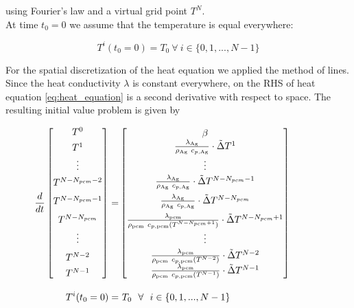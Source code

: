 \documentclass{scrartcl}[12pt, halfparskip]
\begin{document}
using Fourier's law and a virtual grid point $T^N$. \\
At time $t_0=0$ we assume that the temperature is equal everywhere:

\begin{equation}
	T^i(t_0=0) = T_0 \ \forall \ i \in \{ 0,1,...,N-1 \}
\end{equation}

For the spatial discretization of the heat equation we applied the method of lines. Since the heat conductivity $\lambda$ is constant everywhere, on the RHS of heat equation \eqref{eq:heat_equation} is a second derivative with respect to space. The resulting initial value problem is given by

\begin{align}
\hspace{-2cm}
\frac{d}{dt} \begin{bmatrix*}
T^0 \\[1ex]
T^1 \\[0.3ex]
\vdots \\[1ex]
T^{N-N_{pcm}-2} \\[1.7ex]
T^{N-N_{pcm}-1} \\[1.7ex]
T^{N-N_{pcm}} \\[0.5ex]
\vdots \\[1.5ex]
T^{N-2} \\[1ex]
T^{N-1}
\end{bmatrix*} = &
\begin{bmatrix}
\beta \\
\frac{\lambda_{\text{Ag}}}{\rho_{\text{Ag}} \ c_{p,\text{Ag}}} \cdot \tilde{\Delta} T^1 \\[0.7ex]
\vdots \\[0.3ex]
\frac{\lambda_{\text{Ag}}}{\rho_{\text{Ag}} \ c_{p,\text{Ag}}} \cdot \tilde{\Delta} T^{N-N_{pcm}-1} \\[1.5ex]
\frac{\lambda_{\text{Ag}}}{\rho_{\text{Ag}} \ c_{p,\text{Ag}}} \cdot \tilde{\Delta} T^{N-N_{pcm}} \\[1.5ex]
\frac{\lambda_{\text{pcm}}}{\rho_{\text{pcm}} \ c_{p,{\text{pcm}}}(T^{N-N_{pcm}+1})} \cdot \tilde{\Delta} T^{N-N_{pcm}+1} \\[0.5ex]
\vdots \\[0.5ex]
\frac{\lambda_{\text{pcm}}}{\rho_{\text{pcm}} \ c_{p,{\text{pcm}}}(T^{N-2})} \cdot \tilde{\Delta} T^{N-2} \\[0.5ex]
\frac{\lambda_{\text{pcm}}}{\rho_{\text{pcm}} \ c_{p,\text{pcm}}(T^{N-1})} \cdot \tilde{\Delta} T^{N-1}
\end{bmatrix} \label{eq:heat_equation_discretized} \\[2ex]
T^i(t_0=0) = & \ T_0 \ \ \forall \ \ i \in \{ 0,1,...,N-1 \} \nonumber
\end{align}
\end{document}

